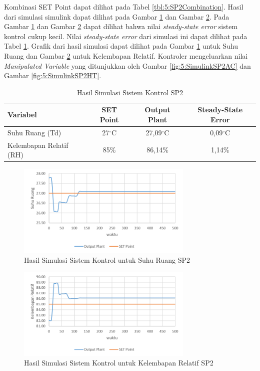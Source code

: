 Kombinasi SET Point dapat dilihat pada Tabel \ref{tbl:5:SP2Combination}. Hasil dari simulasi simulink dapat dilihat pada Gambar \ref{fig:5:SimulinkSP2Td} dan Gambar \ref{fig:5:SimulinkSP2RH}. Pada Gambar \ref{fig:5:SimulinkSP2Td} dan Gambar \ref{fig:5:SimulinkSP2RH} dapat dilihat bahwa nilai \textit{steady-state error} sistem kontrol cukup kecil. Nilai \textit{steady-state error} dari simulasi ini dapat dilihat pada Tabel \ref{tbl:5:SP2Ess}. Grafik dari hasil simulasi dapat dilihat pada Gambar \ref{fig:5:SimulinkSP2Td} untuk Suhu Ruang dan Gambar \ref{fig:5:SimulinkSP2RH} untuk Kelembapan Relatif. Kontroler mengeluarkan nilai \textit{Manipulated Variable} yang ditunjukkan oleh Gambar \ref{fig:5:SimulinkSP2AC} dan Gambar \ref{fig:5:SimulinkSP2HT}.\\

\begin{table}[!h]
	\caption{Hasil Simulasi Sistem Kontrol SP2}
	\label{tbl:5:SP2Ess}
	\centering
	\begin{tabular}{|l|c|c|c|}
		\hline
		\textbf{Variabel} & \textbf{SET Point} & \textbf{Output Plant} & \textbf{Steady-State Error}\\ \hline
		Suhu Ruang (Td) & 27$^\circ$C & 27,09$^\circ$C & 0,09$^\circ$C \\ \hline
		Kelembapan Relatif (RH) & 85\% & 86,14\% & 1,14\% \\ \hline
	\end{tabular}
\end{table}
\hfill\break

\begin{figure}[!h]
	\centering
	\includegraphics[width=0.75\textwidth]{figures/SimulinkSP2Td}
	\caption{Hasil Simulasi Sistem Kontrol untuk Suhu Ruang SP2}
	\label{fig:5:SimulinkSP2Td}
\end{figure}

\begin{figure}[!h]
	\centering
	\includegraphics[width=0.75\textwidth]{figures/SimulinkSP2RH}
	\caption{Hasil Simulasi Sistem Kontrol untuk Kelembapan Relatif SP2}
	\label{fig:5:SimulinkSP2RH}
\end{figure}

